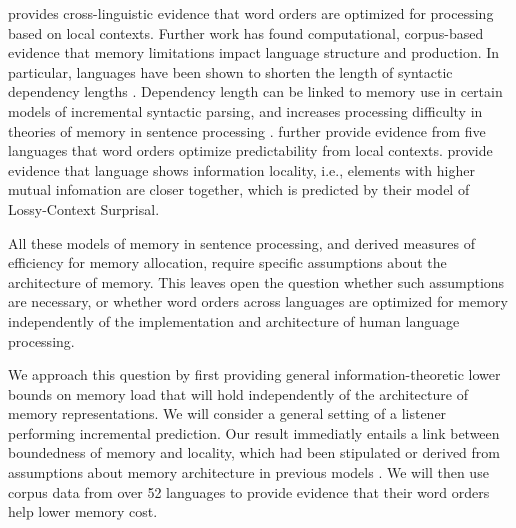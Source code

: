 \cite{hawkins-efficiency-2003} provides cross-linguistic evidence that word orders are optimized for processing based on local contexts.
Further work has found computational, corpus-based evidence that memory limitations impact language structure and production.
In particular, languages have been shown to shorten the length of syntactic dependency lengths \citep{futrell-large-scale-2015}.
Dependency length can be linked to memory use in certain models of incremental syntactic parsing, and increases processing difficulty in theories of memory in sentence processing \citep{gibson-linguistic-1998}.
\cite{gildea-human-2015} further provide evidence from five languages that word orders optimize predictability from local contexts.
\cite{futrell-noisy-context-2017} provide evidence that language shows information locality, i.e., elements with higher mutual infomation are closer together, which is predicted by their model of Lossy-Context Surprisal.

All these models of memory in sentence processing, and derived measures of efficiency for memory allocation, require specific assumptions about the architecture of memory.
This leaves open the question whether such assumptions are necessary, or whether word orders across languages are optimized for memory independently of the implementation and architecture of human language processing.


We approach this question by first providing general information-theoretic lower bounds on memory load that will hold independently of the architecture of memory representations.
We will consider a general setting of a listener performing incremental prediction.
Our result immediatly entails a link between boundedness of memory and locality, which had been stipulated or derived from assumptions about memory architecture in previous models \citep{gibson-linguistic-1998, lewis-activation-based-2005, futrell-noisy-context-2017}.
We will then use corpus data from over 52 languages to provide evidence that their word orders help lower memory cost.



